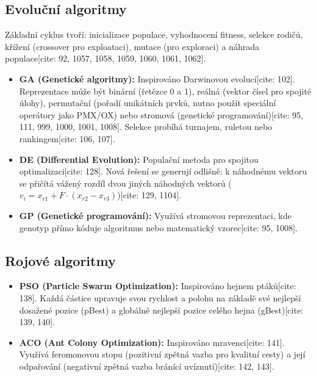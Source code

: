 \documentclass{article}
\begin{document}
\subsection{Evoluční algoritmy}
Základní cyklus tvoří: inicializace populace, vyhodnocení fitness, selekce rodičů, křížení (crossover pro exploataci), mutace (pro exploraci) a náhrada populace[cite: 92, 1057, 1058, 1059, 1060, 1061, 1062].
\begin{itemize}
    \item \textbf{GA (Genetické algoritmy):} Inspirováno Darwinovou evolucí[cite: 102]. Reprezentace může být binární (řetězce 0 a 1), reálná (vektor čísel pro spojité úlohy), permutační (pořadí unikátních prvků, nutno použít speciální operátory jako PMX/OX) nebo stromová (genetické programování)[cite: 95, 111, 999, 1000, 1001, 1008]. Selekce probíhá turnajem, ruletou nebo rankingem[cite: 106, 107].
    \item \textbf{DE (Differential Evolution):} Populační metoda pro spojitou optimalizaci[cite: 128]. Nová řešení se generují odlišně: k náhodnému vektoru se přičítá vážený rozdíl dvou jiných náhodných vektorů ($v_i = x_{r1} + F \cdot (x_{r2} - x_{r3})$)[cite: 129, 1104].
    \item \textbf{GP (Genetické programování):} Využívá stromovou reprezentaci, kde genotyp přímo kóduje algoritmus nebo matematický vzorec[cite: 95, 1008].
\end{itemize}

\subsection{Rojové algoritmy}
\begin{itemize}
    \item \textbf{PSO (Particle Swarm Optimization):} Inspirováno hejnem ptáků[cite: 138]. Každá částice upravuje svou rychlost a polohu na základě své nejlepší dosažené pozice (pBest) a globálně nejlepší pozice celého hejna (gBest)[cite: 139, 140].
    \item \textbf{ACO (Ant Colony Optimization):} Inspirováno mravenci[cite: 141]. Využívá feromonovou stopu (pozitivní zpětná vazba pro kvalitní cesty) a její odpařování (negativní zpětná vazba bránící uvíznutí)[cite: 142, 143].
\end{itemize}
\end{document}
